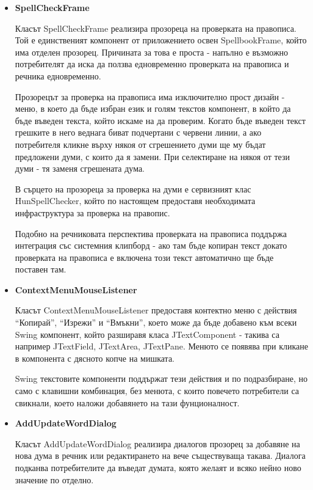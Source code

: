 \begin{itemize}
   \item \textbf{SpellCheckFrame}

     Класът SpellCheckFrame реализира прозореца на проверката на
     правописа. Той е единственият компонент от приложението освен
     SpellbookFrame, който има отделен прозорец. Причината за това е
     проста - напълно е възможно потребителят да иска да ползва
     едновременно проверката на правописа и речника едновременно. 

     Прозорецът за проверка на правописа има изключително прост дизайн
     - меню, в което да бъде избран език и голям текстов компонент, в
     който да бъде въведен текста, който искаме на да проверим. Когато
     бъде въведен текст грешките в него веднага биват подчертани с
     червени линии, а ако потребителя кликне върху някоя от
     сгрешението думи ще му бъдат предложени думи, с които да я
     замени. При селектиране на някоя от тези думи - тя заменя
     сгрешената дума. 

     В сърцето на прозореца за проверка на думи е сервизният клас
     HunSpellChecker, който по настоящем предоставя необходимата
     инфраструктура за проверка на правопис.

     Подобно на речниковата перспектива проверката на правописа
     поддържа интеграция със системния клипборд - ако там бъде копиран
     текст докато проверката на правописа е включена този текст
     автоматично ще бъде поставен там.
   \item \textbf{ContextMenuMouseListener}

     Класът ContextMenuMouseListener предоставя контектно меню с
     действия "`Копирай"', "`Изрежи"' и "`Вмъкни"', което може да бъде
     добавено към всеки Swing компонент, който разширавя класа
     JTextComponent - такива са например JTextField, JTextArea,
     JTextPane. Менюто се появява при кликане в компонента с дясното
     копче на мишката. 

     Swing текстовите компоненти поддържат тези действия и по
     подразбиране, но само с клавишни комбинация, без менюта, с които
     повечето потребители са свикнали, което наложи добавянето на тази
     фунционалност. 
   \item \textbf{AddUpdateWordDialog}

     Класът AddUpdateWordDialog реализира диалогов прозорец за
     добавяне на нова дума в речник или редактирането на вече
     съществуваща такава. Диалога подканва потребителите да въведат
     думата, която желаят и всяко нейно ново значение по отделно. 


\end{itemize}
